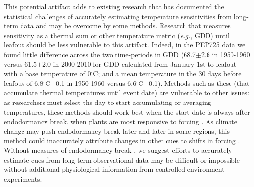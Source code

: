 \documentclass{article}
\begin{document}
%
\par This potential artifact adds to existing research that has documented the statistical challenges of accurately estimating temperature sensitivities from long-term data \emph{\citep{gusewell2017,clark2014a}} and may be overcome by some methods. Research that measures sensitivity as a thermal sum or other temperature metric (\emph{e.g.}, GDD) until leafout should be less vulnerable to this artifact. Indeed, in the PEP725 data we found little difference across the two time-periods in GDD (68.7$\pm$2.6 in 1950-1960 versus 61.5$\pm$2.0 in 2000-2010 for GDD calculated from January 1st to leafout with a base temperature of 0$^{\circ}$C; and a mean temperature in the 30 days before leafout of 6.8$^{\circ}$C$\pm$0.1 in 1950-1960 versus 6.6$^{\circ}$C$\pm$0.1). Methods such as these (that accumulate thermal temperatures until event date) are vulnerable to other issues: as researchers must select the day to start accumulating or averaging temperatures, these methods should work best when the start date is always after endodormancy break, when plants are most responsive to forcing \emph{\citep{chuine2016}}. As climate change may push endodormancy break later and later in some regions, this method could inaccurately attribute changes in other cues to shifts in forcing \emph{\citep{gusewell2017}}. Without measures of endodormancy break \emph{\citep{chuine2016}}, we suggest efforts to accurately estimate cues from long-term observational data may be difficult or impossible without additional physiological information from controlled environment experiments.
\end{document}
